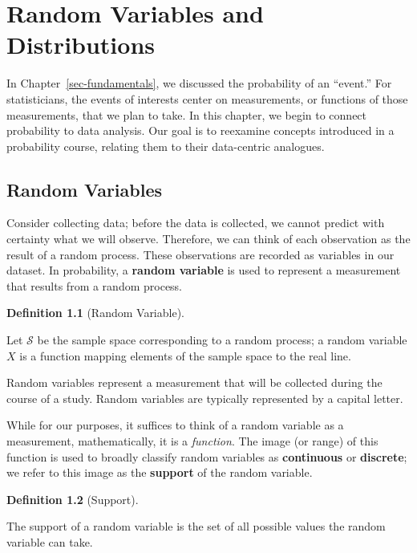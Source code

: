\documentclass[
  letterpaper,
  DIV=11,
  numbers=noendperiod]{scrreprt}
\theoremstyle{definition}
\newtheorem{definition}{Definition}[chapter]
\theoremstyle{definition}
\theoremstyle{plain}
\theoremstyle{remark}
\begin{document}

\hypertarget{sec-randomvariables}{%
\chapter{Random Variables and Distributions}\label{sec-randomvariables}}

In Chapter~\ref{sec-fundamentals}, we discussed the probability of an
``event.'' For statisticians, the events of interests center on
measurements, or functions of those measurements, that we plan to take.
In this chapter, we begin to connect probability to data analysis. Our
goal is to reexamine concepts introduced in a probability course,
relating them to their data-centric analogues.

\hypertarget{random-variables}{%
\section{Random Variables}\label{random-variables}}

Consider collecting data; before the data is collected, we cannot
predict with certainty what we will observe. Therefore, we can think of
each observation as the result of a random process. These observations
are recorded as variables in our dataset. In probability, a
\textbf{random variable} is used to represent a measurement that results
from a random process.

\begin{definition}[Random
Variable]\protect\hypertarget{def-random-variable}{}\label{def-random-variable}

Let \(\mathcal{S}\) be the sample space corresponding to a random
process; a random variable \(X\) is a function mapping elements of the
sample space to the real line.

Random variables represent a measurement that will be collected during
the course of a study. Random variables are typically represented by a
capital letter.

\end{definition}

While for our purposes, it suffices to think of a random variable as a
measurement, mathematically, it is a \emph{function}. The image (or
range) of this function is used to broadly classify random variables as
\textbf{continuous} or \textbf{discrete}; we refer to this image as the
\textbf{support} of the random variable.

\begin{definition}[Support]\protect\hypertarget{def-support}{}\label{def-support}

The support of a random variable is the set of all possible values the
random variable can take.

\end{definition}
\end{document}
